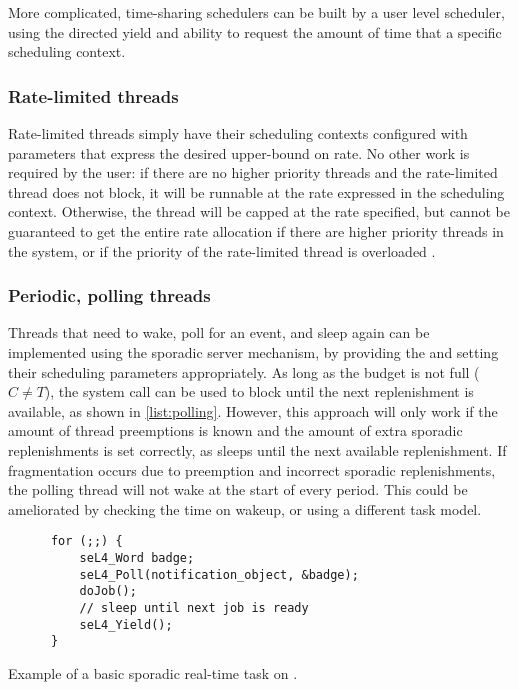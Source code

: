 More complicated, time-sharing schedulers can be built by a user level scheduler, using the directed yield and ability to request the amount of time that a specific scheduling context.

\subsubsection{Rate-limited threads}

Rate-limited threads simply have their scheduling contexts configured with
parameters that express the desired upper-bound on rate.  No other work is
required by the user: if there are no higher priority threads and the
rate-limited thread does not block, it will be runnable at the rate expressed
in the scheduling context.  Otherwise, the thread will be capped at the rate
specified, but cannot be guaranteed to get the entire rate allocation if there
are higher priority threads in the system, or if the priority of the
rate-limited thread is overloaded .

\subsubsection{Periodic, polling threads}

Threads that need to wake, poll for an event, and sleep again can be
implemented using the sporadic server mechanism, by providing the 
and setting their scheduling parameters appropriately. As long as the budget is
not full ($C\neq T$), the \yield system call can be used to block until the next replenishment
is available, as shown in \cref{list:polling}. However, this approach will only work if the amount of thread preemptions 
is known and the amount of extra sporadic replenishments is set correctly, as \yield sleeps until
the next available replenishment. If fragmentation occurs due to preemption and incorrect sporadic
replenishments, the polling thread will not wake at the start of every period. This could be
ameliorated by checking the time on wakeup, or using a different task model.  

\begin{listing}
  \begin{verbatim}
      for (;;) {
          seL4_Word badge;
          seL4_Poll(notification_object, &badge);
          doJob();
          // sleep until next job is ready
          seL4_Yield();
      }
  \end{verbatim}
  \caption{Example of a basic sporadic real-time task on \selfour.}
  \label{list:polling}
\end{listing}

